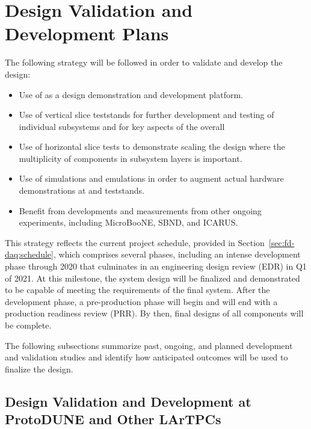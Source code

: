 \section{Design Validation and Development Plans}
\label{sec:fd-daq:validation}

The following strategy will be followed in order to validate and
develop the    design:
\begin{itemize}
\item Use of  as a design demonstration and
  development platform. 
\item Use of vertical slice teststands for further development and testing of
  individual  subsystems and for key aspects of the
  overall 
\item Use of horizontal slice tests to demonstrate scaling the design
  where the multiplicity of components in subsystem layers is important.
\item Use of   simulations and emulations in order
  to augment actual hardware demonstrations at  and teststands.
\item Benefit from developments and measurements from other ongoing
   experiments, including MicroBooNE, SBND, and ICARUS.
\end{itemize}

This strategy reflects the current  project schedule,
provided in Section~\ref{sec:fd-daq:schedule}, which
comprises several phases, including an intense development phase
through 2020 that culminates in an engineering design
review (EDR) in Q1 of 2021. At this milestone, the system design will be
finalized and demonstrated to be capable of meeting the requirements of the
final  system. After the development phase, a
pre-production phase will begin and will end with a production readiness
review (PRR). By then, final designs of all components
will be complete.

The following subsections summarize past, ongoing, and planned
development and validation studies and identify how anticipated outcomes
will be used to finalize the  design.

\subsection{Design Validation and Development at ProtoDUNE and Other
  LArTPCs} %

\label{sec:fd-daq:protodune}

